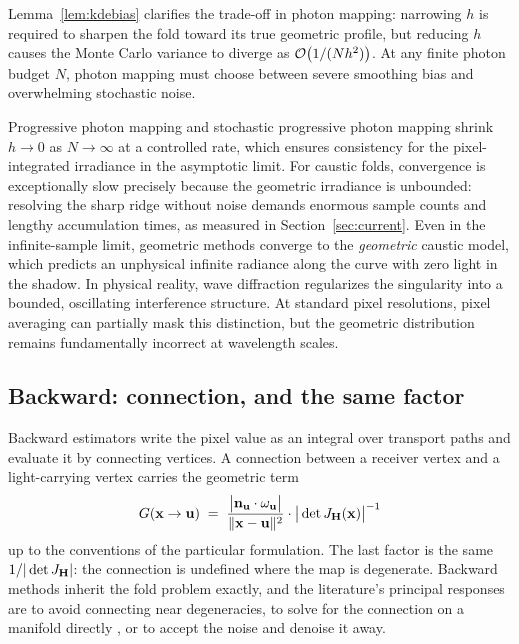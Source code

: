 Lemma~\ref{lem:kdebias} clarifies the trade-off in photon mapping: narrowing $h$
is required to sharpen the fold toward its true geometric profile, but reducing $h$
causes the Monte Carlo variance to diverge as $\mathcal{O}\!\left(1/(N h^2)\right)$. At any finite
photon budget $N$, photon mapping must choose between severe smoothing bias and
overwhelming stochastic noise.

Progressive photon mapping \cite{hachisuka2008} and stochastic progressive photon mapping
\cite{hachisuka2009} shrink $h \to 0$ as $N \to \infty$ at a controlled rate, which ensures
consistency for the pixel-integrated irradiance in the asymptotic limit.
For caustic folds, convergence is exceptionally slow precisely because the
geometric irradiance is unbounded: resolving the sharp ridge without noise demands
enormous sample counts and lengthy accumulation times, as measured in Section~\ref{sec:current}.
Even in the infinite-sample limit, geometric methods converge to the
\emph{geometric} caustic model, which predicts an unphysical infinite radiance along the
curve with zero light in the shadow. In physical reality, wave diffraction regularizes the
singularity into a bounded, oscillating interference structure. At standard pixel resolutions,
pixel averaging can partially mask this distinction, but the geometric distribution
remains fundamentally incorrect at wavelength scales.

\subsection{Backward: connection, and the same factor}
\label{sec:backward}

Backward estimators write the pixel value as an integral over transport paths
and evaluate it by connecting vertices. A connection between a receiver vertex
and a light-carrying vertex carries the geometric term
\begin{equation}
G(\mathbf{x} \to \mathbf{u}) \;=\;
\frac{\big|\mathbf{n}_{\mathbf{u}} \cdot \omega_{\mathbf{u}}\big|}
{\|\mathbf{x} - \mathbf{u}\|^{2}} \cdot
\big|\det J_{\mathbf{H}}(\mathbf{x})\big|^{-1}
\label{eq:geometricterm}
\end{equation}
up to the conventions of the particular formulation. The last factor is the
same $1/|\det J_{\mathbf{H}}|$: the connection is undefined where the map is degenerate.
Backward methods inherit the fold problem exactly, and the
literature's principal responses are to avoid connecting near degeneracies, to solve for the connection on a manifold directly \cite{hanika2015,zeltner2020}, or to accept the noise and denoise it away.

